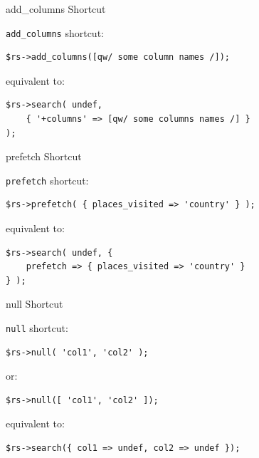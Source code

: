 \begin{frame}[fragile]{add\_columns Shortcut}

\verb|add_columns| shortcut:

\begin{lstlisting}
$rs->add_columns([qw/ some column names /]);
\end{lstlisting}

equivalent to:

\begin{lstlisting}
$rs->search( undef,
    { '+columns' => [qw/ some columns names /] }
);
\end{lstlisting}
\end{frame}

\begin{frame}[fragile]{prefetch Shortcut}

\verb|prefetch| shortcut:

\begin{lstlisting}
$rs->prefetch( { places_visited => 'country' } );
\end{lstlisting}

equivalent to:

\begin{lstlisting}
$rs->search( undef, { 
    prefetch => { places_visited => 'country' } 
} );
\end{lstlisting}

\end{frame}


\begin{frame}[fragile]{null Shortcut}

\verb|null| shortcut:

\begin{lstlisting}
$rs->null( 'col1', 'col2' );
\end{lstlisting}

or:

\begin{lstlisting}
$rs->null([ 'col1', 'col2' ]);
\end{lstlisting}

equivalent to:

\begin{lstlisting}
$rs->search({ col1 => undef, col2 => undef });
\end{lstlisting}
\end{frame}


